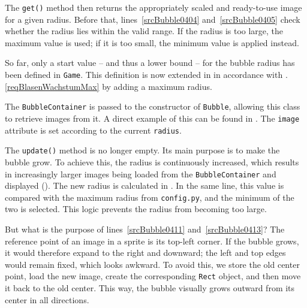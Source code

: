 The \texttt{get()} method then returns the appropriately scaled and ready-to-use image for a given radius. Before that, lines~\ref{srcBubble0404} and~\ref{srcBubble0405} check whether the radius lies within the valid range. If the radius is too large, the maximum value is used; if it is too small, the minimum value is applied instead.


So far, only a start value -- and thus a lower bound -- for the bubble radius has been defined in \texttt{Game}. This definition is now extended in  in accordance with .\ref{reqBlasenWachstumMax} by adding a maximum radius.


The \texttt{BubbleContainer} is passed to the constructor of \texttt{Bubble}, allowing this class to retrieve images from it. A direct example of this can be found in . The \texttt{image} attribute is set according to the current \texttt{radius}.

The \texttt{update()} method is no longer empty. Its main purpose is to make the bubble grow. To achieve this, the radius is continuously increased, which results in increasingly larger images being loaded from the \texttt{BubbleContainer} and displayed (). The new radius is calculated in . In the same line, this value is compared with the maximum radius from \texttt{config.py}, and the minimum of the two is selected. This logic prevents the radius from becoming too large.

\begin{hintbox}
	But what is the purpose of lines~\ref{srcBubble0411} and~\ref{srcBubble0413}? The reference point of an image in a sprite is its top-left corner. If the bubble grows, it would therefore expand to the right and downward; the left and top edges would remain fixed, which looks awkward. To avoid this, we store the old center point, load the new image, create the corresponding \texttt{Rect} object, and then move it back to the old center. This way, the bubble visually grows outward from its center in all directions.
\end{hintbox}

